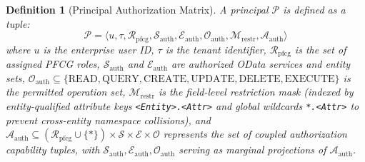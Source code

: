 \documentclass[conference,10pt]{IEEEtran}
\newtheorem{definition}{Definition}
\begin{document}
\begin{definition}[Principal Authorization Matrix]
A principal $\mathcal{P}$ is defined as a tuple:
\begin{equation}
\mathcal{P} = \langle u, \tau, \mathcal{R}_{\text{pfcg}}, \mathcal{S}_{\text{auth}}, \mathcal{E}_{\text{auth}}, \mathcal{O}_{\text{auth}}, \mathcal{M}_{\text{restr}}, \mathcal{A}_{\text{auth}} \rangle
\end{equation}
where $u$ is the enterprise user ID, $\tau$ is the tenant identifier, $\mathcal{R}_{\text{pfcg}}$ is the set of assigned PFCG roles, $\mathcal{S}_{\text{auth}}$ and $\mathcal{E}_{\text{auth}}$ are authorized OData services and entity sets, $\mathcal{O}_{\text{auth}} \subseteq \{\text{READ}, \text{QUERY}, \text{CREATE}, \text{UPDATE}, \text{DELETE}, \text{EXECUTE}\}$ is the permitted operation set, $\mathcal{M}_{\text{restr}}$ is the field-level restriction mask (indexed by entity-qualified attribute keys \texttt{<Entity>.<Attr>} and global wildcards \texttt{*.<Attr>} to prevent cross-entity namespace collisions), and $\mathcal{A}_{\text{auth}} \subseteq (\mathcal{R}_{\text{pfcg}} \cup \{*\}) \times \mathcal{S} \times \mathcal{E} \times \mathcal{O}$ represents the set of coupled authorization capability tuples, with $\mathcal{S}_{\text{auth}}, \mathcal{E}_{\text{auth}}, \mathcal{O}_{\text{auth}}$ serving as marginal projections of $\mathcal{A}_{\text{auth}}$.
\end{definition}
\end{document}
